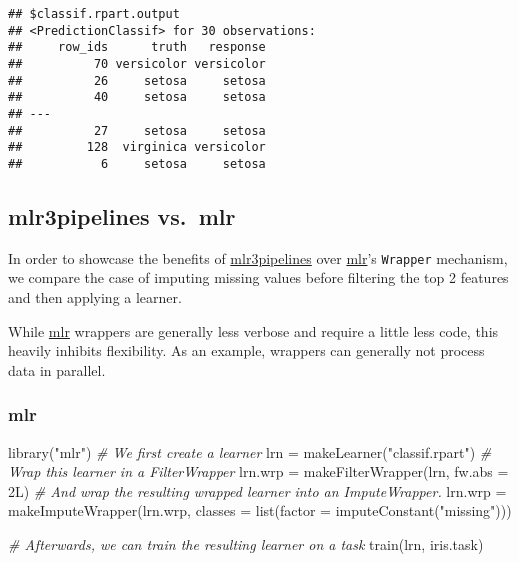 \documentclass[
]{scrbook}
\newenvironment{Shaded}{\begin{snugshade}}{\end{snugshade}}
\newcommand{\AttributeTok}[1]{\textcolor[rgb]{0.77,0.63,0.00}{#1}}
\newcommand{\CommentTok}[1]{\textcolor[rgb]{0.56,0.35,0.01}{\textit{#1}}}
\newcommand{\FunctionTok}[1]{\textcolor[rgb]{0.00,0.00,0.00}{#1}}
\newcommand{\NormalTok}[1]{#1}
\newcommand{\OtherTok}[1]{\textcolor[rgb]{0.56,0.35,0.01}{#1}}
\newcommand{\SpecialCharTok}[1]{\textcolor[rgb]{0.00,0.00,0.00}{#1}}
\newcommand{\StringTok}[1]{\textcolor[rgb]{0.31,0.60,0.02}{#1}}
\renewenvironment{Shaded} {\begin{snugshade}\small} {\end{snugshade}}
\begin{document}
\begin{Shaded}
\end{Shaded}

\begin{verbatim}
## $classif.rpart.output
## <PredictionClassif> for 30 observations:
##     row_ids      truth   response
##          70 versicolor versicolor
##          26     setosa     setosa
##          40     setosa     setosa
## ---                              
##          27     setosa     setosa
##         128  virginica versicolor
##           6     setosa     setosa
\end{verbatim}

\hypertarget{mlr3pipelines-vs.-mlr}{%
\subsection{mlr3pipelines vs.~mlr}\label{mlr3pipelines-vs.-mlr}}

In order to showcase the benefits of \href{https://cran.r-project.org/package=mlr3pipelines}{mlr3pipelines} over \href{https://cran.r-project.org/package=mlr}{mlr}'s \texttt{Wrapper} mechanism, we compare the case of imputing missing values before filtering the top 2 features and then applying a learner.

While \href{https://cran.r-project.org/package=mlr}{mlr} wrappers are generally less verbose and require a little less code, this heavily inhibits flexibility.
As an example, wrappers can generally not process data in parallel.

\hypertarget{mlr}{%
\subsubsection{mlr}\label{mlr}}

\begin{Shaded}
\begin{Highlighting}[]
\FunctionTok{library}\NormalTok{(}\StringTok{"mlr"}\NormalTok{)}
\CommentTok{\# We first create a learner}
\NormalTok{lrn }\OtherTok{=} \FunctionTok{makeLearner}\NormalTok{(}\StringTok{"classif.rpart"}\NormalTok{)}
\CommentTok{\# Wrap this learner in a FilterWrapper}
\NormalTok{lrn.wrp }\OtherTok{=} \FunctionTok{makeFilterWrapper}\NormalTok{(lrn, }\AttributeTok{fw.abs =}\NormalTok{ 2L)}
\CommentTok{\# And wrap the resulting wrapped learner into an ImputeWrapper.}
\NormalTok{lrn.wrp }\OtherTok{=} \FunctionTok{makeImputeWrapper}\NormalTok{(lrn.wrp, }\AttributeTok{classes =} \FunctionTok{list}\NormalTok{(}\AttributeTok{factor =} \FunctionTok{imputeConstant}\NormalTok{(}\StringTok{"missing"}\NormalTok{)))}

\CommentTok{\# Afterwards, we can train the resulting learner on a task}
\FunctionTok{train}\NormalTok{(lrn, iris.task)}
\end{Highlighting}
\end{Shaded}
\end{document}
